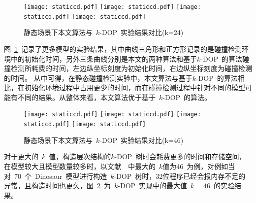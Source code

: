 \begin{figure}[htb] 
\centering
{}
{  
   \texttt{[image: staticcd.pdf]}
}
{  
    \texttt{[image: staticcd.pdf]}
}\linebreak %
{  
   \texttt{[image: staticcd.pdf]}
}
{  
   \texttt{[image: staticcd.pdf]}
}
\caption{静态场景下本文算法与~$k$-DOP~实验结果对比(k=24)}
\label{fig:chart:exps:kdop:kcbp:k24}
\end{figure}

图~\ref{fig:chart:exps:kdop:kcbp:k24}~记录了更多模型的实验结果，其中曲线三角形和正方形记录的是碰撞检测环境中的初始化时间，另外三条曲线分别是本文的两种算法和基于$k$-DOP~的算法碰撞检测所耗费的时间，左边纵坐标刻度为初始化时间，右边纵坐标刻度为碰撞检测的时间。
从中可得，在静态碰撞检测实验中，本文算法与基于$k$-DOP~的算法相比，在初始化环境过程中占用更少的时间，而在碰撞检测过程中针对不同的模型可能有不同的结果。从整体来看，本文算法优于基于~$k$-DOP~的算法。

\begin{figure}[htb] 
\centering
{}
{  
   \texttt{[image: staticcd.pdf]}
}
{  
    \texttt{[image: staticcd.pdf]}
}\linebreak %
{  
   \texttt{[image: staticcd.pdf]}
}
{  
   \texttt{[image: staticcd.pdf]}
}
\caption{静态场景下本文算法与~$k$-DOP~实验结果对比(k=46)}
\label{fig:chart:exps:kdop:kcbp:k46}
\end{figure}

对于更大的~$k$~值，构造层次结构的$k$-DOP~树时会耗费更多的时间和存储空间，在模型较大且模型数量较多时，以文献~~中最大的~$k$值为46~为例，对例如当对~70~个~Dinosaur~模型进行构造~$k$-DOP~树时，32位程序已经会报内存不足的异常，且构造时间也更久，图~\ref{fig:chart:exps:kdop:kcbp:k46}~为~$k$-DOP~实现中的最大值~$k=46$~的实验结果。

